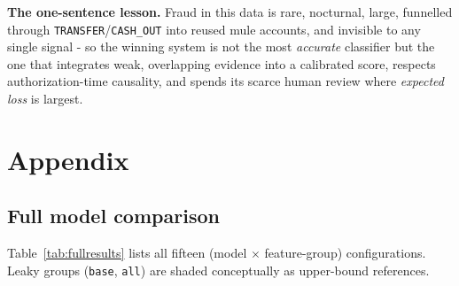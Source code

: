 \documentclass[11pt,a4paper]{report}
\newcommand{\code}[1]{\texttt{\small #1}}
\begin{document}
\begin{keybox}
\textbf{The one-sentence lesson.} Fraud in this data is rare, nocturnal, large, funnelled through \code{TRANSFER}/\code{CASH\_OUT} into reused mule accounts, and invisible to any single signal - so the winning system is not the most \emph{accurate} classifier but the one that integrates weak, overlapping evidence into a calibrated score, respects authorization-time causality, and spends its scarce human review where \emph{expected loss} is largest.
\end{keybox}

\appendix
\chapter{Appendix}

\section{Full model comparison}

Table~\ref{tab:fullresults} lists all fifteen (model $\times$ feature-group) configurations.
Leaky groups (\code{base}, \code{all}) are shaded conceptually as upper-bound references.
\end{document}
